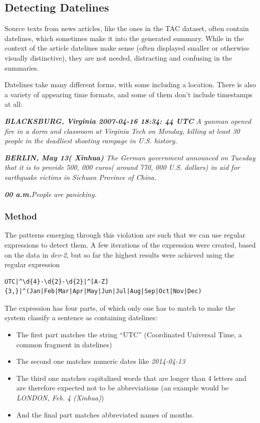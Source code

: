 \documentclass[a4paper,10pt]{scrartcl}
\theoremstyle{style}
\begin{document}
\newpage
\subsection{Detecting Datelines}
\label{s_datelines}
Source texts from news articles, like the ones in the TAC dataset, often contain datelines, which sometimes make it into the generated summary. While in the context of the article datelines make sense (often displayed smaller or otherwise visually distinctive), they are not needed, distracting and confusing in the summaries.

Datelines take many different forms, with some including a location. There is also a variety of appearing time formats, and some of them don't include timestamps at all:

\begin{framed}
\quad\textit{\textbf{BLACKSBURG, Virginia 2007-04-16 18:34: 44 UTC} A gunman opened fire in a dorm and classroom at Virginia Tech on Monday, killing at least 30 people in the deadliest shooting rampage in U.S. history.}

\quad\textit{\textbf{BERLIN, May 13( Xinhua)} The German government announced on Tuesday that it is to provide 500, 000 euros( around 770, 000 U.S. dollars) in aid for earthquake victims in Sichuan Province of China.}

\quad\textit{\textbf{00 a.m.}People are panicking.}
\end{framed}

\subsubsection{Method}
The patterns emerging through this violation are such that we can use regular expressions to detect them. A few iterations of the expression were created, based on the data in \textit{dev-2}, but so far the highest results were achieved using the regular expression

\begin{lstlisting}
UTC|^\d{4}-\d{2}-\d{2}|^[A-Z]{3,}|^(Jan|Feb|Mar|Apr|May|Jun|Jul|Aug|Sep|Oct|Nov|Dec)
\end{lstlisting}

The expression has four parts, of which only one has to match to make the system classify a sentence as containing datelines:

\begin{itemize}
\item The first part matches the string ``UTC'' (Coordinated Universal Time, a common fragment in datelines)
\item The second one matches numeric dates like \textit{2014-04-13}
\item The third one matches capitalized words that are longer than 4 letters and are therefore expected not to be abbreviations (an example would be \textit{LONDON, Feb. 4 (Xinhua)})
\item And the final part matches abbreviated names of months.
\end{itemize}
\end{document}
